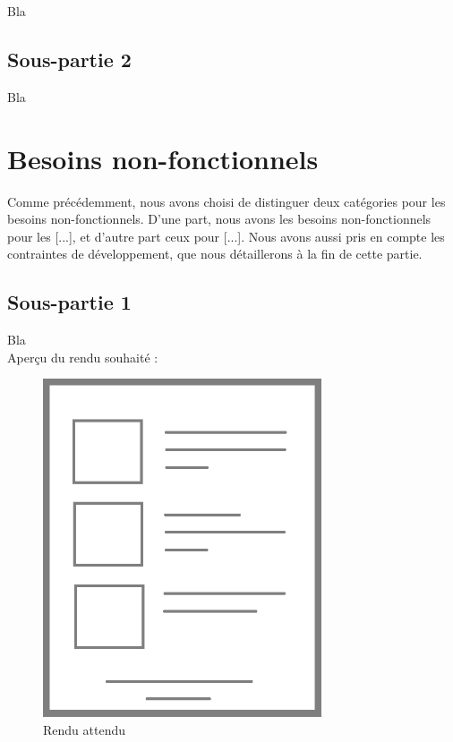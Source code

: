 Bla

\subsection{Sous-partie 2}

Bla

\newpage

\section{Besoins non-fonctionnels}

Comme précédemment, nous avons choisi de distinguer deux catégories pour les besoins non-fonctionnels. D'une part, nous avons les besoins non-fonctionnels pour les [...], et d'autre part ceux pour [...]. Nous avons aussi pris en compte les contraintes de développement, que nous détaillerons à la fin de cette partie.

\subsection{Sous-partie 1}

Bla\\

Aperçu du rendu souhaité :

\begin{figure}[!h]
\begin{center}
\includegraphics[height=10cm]{besoins/rendu}
\end{center}
\caption{Rendu attendu}
\end{figure}

